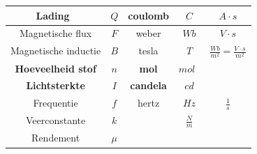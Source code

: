 \documentclass{ximera}
\begin{document}
\begin{longtable}{|c|c||c|c|c|}
\hline
Lading~                                      & $Q$                                      & coulomb                                    & $C$                                 & $A\cdot s$                                                \\ 
\hline
Magnetische flux                            & $F$                                      & weber                                      & $Wb$                                & $V\cdot s$                                                \\ 
\hline
Magnetische inductie                        & $B$                                      & tesla                                      & $T$                                & $\frac{Wb}{m^2}= \frac{V\cdot s}{m^2}$                    \\ 
\hline
\cellcolor{blue!50!red}\textbf{Hoeveelheid stof}                  & \cellcolor{blue!50!red}\textbf{$n$}                             & \cellcolor{blue!50!red}\textbf{mol}                              & \cellcolor{blue!50!red}\textbf{$mol$}~                      & \cellcolor{blue!50!red}                                                         \\ 
\hline
\cellcolor{red!20!blue}\textbf{Lichtsterkte}                      & \cellcolor{red!20!blue}\textbf{$I$}                             & \cellcolor{red!20!blue}\textbf{candela}                           & \cellcolor{red!20!blue}\textbf{}$cd $                       & \cellcolor{red!20!blue}                                                         \\ 
\hline
Frequentie                                 & $f$                                      & hertz                                     & $Hz$                                & $\frac{1}{s}$                         \\ 
\hline
Veerconstante                               & $k$                                      &                                           & $\frac{N}{m}$   &                                                         \\ 
\hline
Rendement                                 & $\mu$                                    &                                          &                                &                                                          \\
\hline
\end{longtable}
\renewcommand{\arraystretch}{1}
\end{document}

